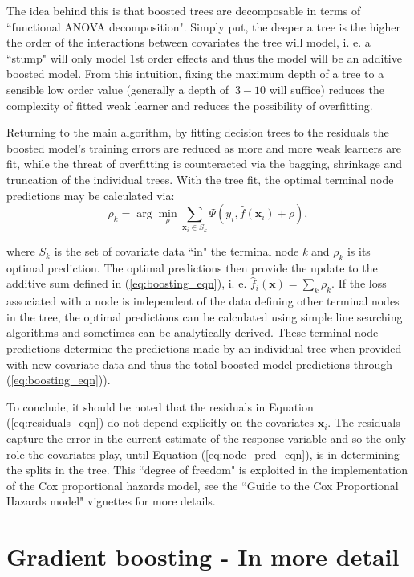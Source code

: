 \documentclass{article}
\begin{document}
The idea behind this is that boosted trees are decomposable in terms of ``functional ANOVA decomposition". Simply put, the deeper a tree is the higher the order of the interactions between covariates the tree will model, i. e. a ``stump" will only model 1st order effects and thus the model will be an additive boosted model.  From this intuition, fixing the maximum depth of a tree to a sensible low order value (generally a depth of $~3-10$ will suffice) reduces the complexity of fitted weak learner and reduces the possibility of overfitting.

Returning to the main algorithm, by fitting decision trees to the residuals the boosted model's training errors are reduced as more and more weak learners are fit, while the threat of overfitting is counteracted via the bagging, shrinkage and truncation of the individual trees. With the tree fit, the optimal terminal node predictions may be calculated via:
\begin{equation}
\label{eq:node_pred_eqn}
\rho_k = \arg \min_{\rho} \sum_{\mathbf{x}_i \in S_k} \Psi(y_i, \hat{f}(\mathbf{x}_i) +\rho),  
\end{equation}

where $S_{k}$ is the set of covariate data ``in" the terminal node \textit{k} and $\rho_k$ is its optimal prediction.  The optimal predictions then provide the update to the additive sum defined in (\ref{eq:boosting_eqn}), i. e. $\hat{f}_i(\mathbf{x}) = \sum_k \rho_k$.  If the loss associated with a node is independent of the data defining other terminal nodes in the tree, the optimal predictions can be calculated using simple line searching algorithms and sometimes can be analytically derived.  These terminal node predictions determine the predictions made by an individual tree when provided with new covariate data and thus the total boosted model predictions through (\ref{eq:boosting_eqn})).


To conclude, it should be noted that the residuals in Equation (\ref{eq:residuals_eqn}) do not depend explicitly on the covariates $\mathbf{x}_{i}$.  The residuals capture the error in the current estimate of the response variable and so the only role the covariates play, until Equation (\ref{eq:node_pred_eqn}), is in determining the splits in the tree.  This ``degree of freedom" is exploited in the implementation of the Cox proportional hazards model, see the ``Guide to the Cox Proportional Hazards model" vignettes for more details.

\section{Gradient boosting - In more detail}
\end{document}
